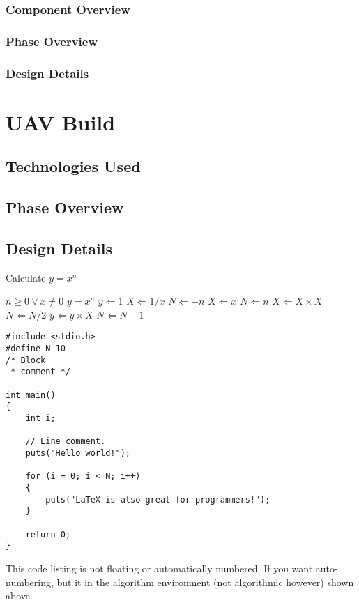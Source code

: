\subsubsection{Component  Overview}
\subsubsection{Phase Overview}
\subsubsection{Design Details}

\section{UAV Build}
\subsection{Technologies  Used}
\subsection{Phase Overview}
\subsection{Design Details}


\begin{algorithm} [tbh]                     %
\caption{Calculate $y = x^n$}          %
\label{alg1}                           %
\begin{algorithmic}                    %
    \REQUIRE $n \geq 0 \vee x \neq 0$
    \ENSURE $y = x^n$
    \STATE $y \Leftarrow 1$
        \STATE $X \Leftarrow 1 / x$
        \STATE $N \Leftarrow -n$
    \ELSE
        \STATE $X \Leftarrow x$
        \STATE $N \Leftarrow n$
    \ENDIF
            \STATE $X \Leftarrow X \times X$
            \STATE $N \Leftarrow N / 2$
        \ELSE[$N$ is odd]
            \STATE $y \Leftarrow y \times X$
            \STATE $N \Leftarrow N - 1$
        \ENDIF
    \ENDWHILE
\end{algorithmic}
\end{algorithm} 
 
\begin{lstlisting}
#include <stdio.h>
#define N 10
/* Block
 * comment */
 
int main()
{
    int i;
 
    // Line comment.
    puts("Hello world!");
 
    for (i = 0; i < N; i++)
    {
        puts("LaTeX is also great for programmers!");
    }
 
    return 0;
}
\end{lstlisting}
This code listing is not floating or automatically numbered.  If you want auto-numbering, but it in the algorithm environment (not algorithmic however) shown above.
